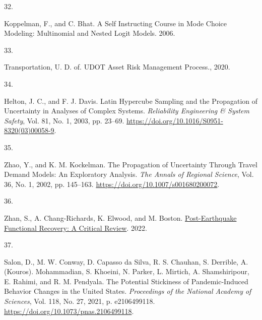 \documentclass[
  letterpaper,
]{trb}
\newlength{\cslhangindent}
\newlength{\csllabelwidth}
\newlength{\cslentryspacingunit} %
\newenvironment{CSLReferences}[2] %
 {%
  \setlength{\parindent}{0pt}
  \ifodd #1
  \let\oldpar\par
  \def\par{\hangindent=\cslhangindent\oldpar}
  \fi
  \setlength{\parskip}{#2\cslentryspacingunit}
 }%
 {}
\newcommand{\CSLLeftMargin}[1]{\parbox[t]{\csllabelwidth}{#1}}
\newcommand{\CSLRightInline}[1]{\parbox[t]{\linewidth - \csllabelwidth}{#1}\break}
\begin{document}
\begin{CSLReferences}{0}{0}
\leavevmode{}%
\CSLLeftMargin{32. }%
\CSLRightInline{Koppelman, F., and C. Bhat. A Self Instructing Course in
Mode Choice Modeling: Multinomial and Nested Logit Models. 2006.}

\leavevmode{}%
\CSLLeftMargin{33. }%
\CSLRightInline{Transportation, U. D. of. UDOT Asset Risk Management
Process., 2020.}

\leavevmode{}%
\CSLLeftMargin{34. }%
\CSLRightInline{Helton, J. C., and F. J. Davis. Latin Hypercube Sampling
and the Propagation of Uncertainty in Analyses of Complex Systems.
\emph{Reliability Engineering \& System Safety}, Vol. 81, No. 1, 2003,
pp. 23--69. \url{https://doi.org/10.1016/S0951-8320(03)00058-9}.}

\leavevmode{}%
\CSLLeftMargin{35. }%
\CSLRightInline{Zhao, Y., and K. M. Kockelman. The Propagation of
Uncertainty Through Travel Demand Models: An Exploratory Analysis.
\emph{The Annals of Regional Science}, Vol. 36, No. 1, 2002, pp.
145--163. \url{https://doi.org/10.1007/s001680200072}.}

\leavevmode{}%
\CSLLeftMargin{36. }%
\CSLRightInline{Zhan, S., A. Chang-Richards, K. Elwood, and M. Boston.
\href{https://repo.nzsee.org.nz/xmlui/handle/nzsee/2507}{Post-Earthquake
Functional Recovery: A Critical Review}. 2022.}

\leavevmode{}%
\CSLLeftMargin{37. }%
\CSLRightInline{Salon, D., M. W. Conway, D. Capasso da Silva, R. S.
Chauhan, S. Derrible, A. (Kouros). Mohammadian, S. Khoeini, N. Parker,
L. Mirtich, A. Shamshiripour, E. Rahimi, and R. M. Pendyala. The
Potential Stickiness of Pandemic-Induced Behavior Changes in the United
States. \emph{Proceedings of the National Academy of Sciences}, Vol.
118, No. 27, 2021, p. e2106499118.
\url{https://doi.org/10.1073/pnas.2106499118}.}

\end{CSLReferences}
\end{document}
